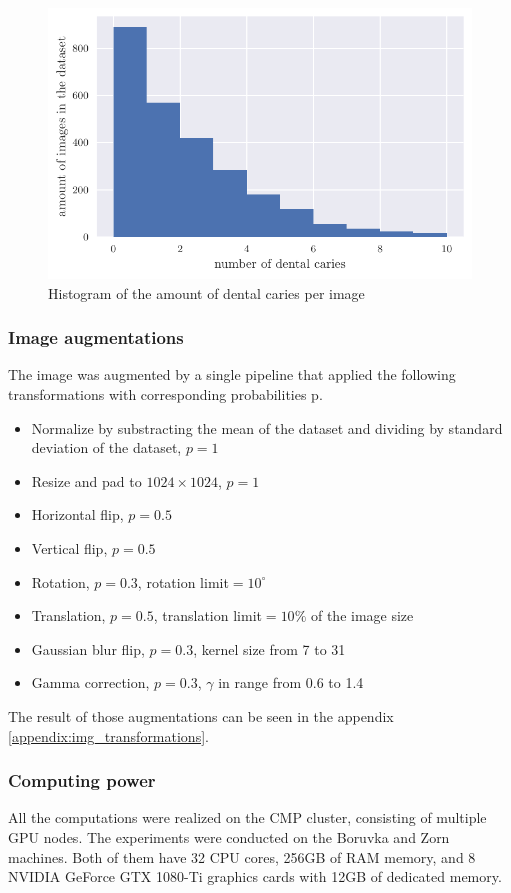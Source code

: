 \begin{figure}
    \includegraphics[width=\linewidth]{images/caries_histogram.pdf}
    \caption{Histogram of the amount of dental caries per image}
    \label{fig:hist_caries_per_img}
\end{figure}
\subsubsection{Image augmentations}
The image was augmented by a single pipeline that applied the following transformations with corresponding probabilities p.
\begin{itemize}
    \item Normalize by substracting the mean of the dataset and dividing by standard deviation of the dataset, $p=1$
    \item Resize and pad to $1024\times1024$, $p=1$
    \item Horizontal flip, $p=0.5$
    \item Vertical flip, $p=0.5$
    \item Rotation, $p=0.3$, rotation limit$=10^{\circ}$
    \item Translation, $p=0.5$, translation limit$=10\%$ of the image size
    \item Gaussian blur flip, $p=0.3$, kernel size from 7 to 31
    \item Gamma correction, $p=0.3$, $\gamma$ in range from 0.6 to 1.4
\end{itemize}

The result of those augmentations can be seen in the appendix \ref{appendix:img_transformations}.
\subsubsection{Computing power}
All the computations were realized on the CMP cluster, consisting of multiple GPU nodes. The experiments were conducted on the Boruvka and Zorn machines. Both of them have 32 CPU cores, 256GB of RAM memory, and 8 NVIDIA GeForce GTX 1080-Ti graphics cards with 12GB of dedicated memory.

